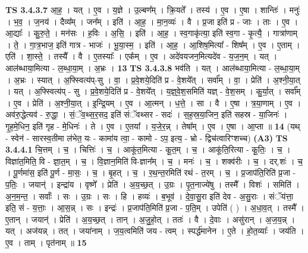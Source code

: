 \documentclass[17pt]{extarticle}
\begin{document}
                                \textbf{ TS 3.4.3.7} \newline
                  आ॒ह॒ । यत् । ए॒व । य॒ज्ञे । उ॒ल्बण᳚म् । क्रि॒यते᳚ । तस्य॑ । ए॒व । ए॒षा । शान्तिः॑ । मनुः॑ । भ॒व॒ । ज॒नय॑ । दैव्य᳚म् । जन᳚म् । इति॑ । आ॒ह॒ । मा॒न॒व्यः॑ । वै । प्र॒जा इति॑ प्र - जाः । ताः । ए॒व । आ॒द्याः᳚ । कु॒रु॒ते॒ । मन॑सः । ह॒विः । अ॒सि॒ । इति॑ । आ॒ह॒ । स्व॒गाकृ॑त्या॒ इति॑ स्व॒गा - कृ॒त्यै॒ । गात्रा॑णाम् । ते॒ । गा॒त्र॒भाज॒ इति॑ गात्र - भाजः॑ । भू॒या॒स्म॒ । इति॑ । आ॒ह॒ । आ॒शिष॒मित्या᳚ - शिष᳚म् । ए॒व । ए॒ताम् । एति॑ । शा॒स्ते॒ । तस्यै᳚ । वै । ए॒तस्याः᳚ । एक᳚म् । ए॒व । अदे॑वयजन॒मित्यदे॑व - य॒ज॒न॒म् । यत् । आल॑ब्धाया॒मित्या - ल॒ब्धा॒या॒म् । अ॒भ्रः । \textbf{  13} \newline
                  \newline
                                \textbf{ TS 3.4.3.8} \newline
                  भव॑ति । यत् । आल॑ब्धाया॒मित्या - ल॒ब्धा॒या॒म् । अ॒भ्रः । स्यात् । अ॒फ्स्वित्य॑प्-सु । वा॒ । प्र॒वे॒शये॒दिति॑ प्र - वे॒शये᳚त् । सर्वा᳚म् । वा॒ । प्रेति॑ । अ॒श्नी॒या॒त् । यत् । अ॒फ्स्वित्य॑प् - सु । प्र॒वे॒शये॒दिति॑ प्र - वे॒शये᳚त् । य॒ज्ञ्॒वे॒श॒समिति॑ यज्ञ् - वे॒श॒सम् । कु॒र्या॒त् । सर्वा᳚म् । ए॒व । प्रेति॑ । अ॒श्नी॒या॒त् । इ॒न्द्रि॒यम् । ए॒व । आ॒त्मन् । ध॒त्ते॒ । सा । वै । ए॒षा । त्र॒या॒णाम् । ए॒व । अव॑रु॒द्धेत्यव॑ - रु॒द्धा॒ । सं॒ॅव॒थ्स॒र॒सद॒ इति॑ संॅवथ्सर - सदः॑ । स॒ह॒स्र॒या॒जिन॒ इति॑ सहस्र - या॒जिनः॑ । गृ॒ह॒मे॒धिन॒ इति॑ गृह - मे॒धिनः॑ । ते । ए॒व । ए॒तया᳚ । य॒जे॒र॒न्न् । तेषा᳚म् । ए॒व । ए॒षा । आ॒प्ता ॥ \textbf{  14} \newline
                  \newline
                      (यथ् - स्वेन॑ - सारस्व॒तीमा ल॑भेत॒ यः - कामा॑य त्वा॒ - कामो - ऽप॒ इत्य॒ - भ्रो - द्विच॑त्वारिꣳशच्च)  \textbf{(A3)} \newline \newline
                                \textbf{ TS 3.4.4.1} \newline
                  चि॒त्तम् । च॒ । चित्तिः॑ । च॒ । आकू॑त॒मित्या - कू॒त॒म् । च॒ । आकू॑ति॒रित्या - कू॒तिः॒ । च॒ । विज्ञा॑त॒मिति॒ वि - ज्ञा॒त॒म् । च॒ । वि॒ज्ञान॒मिति॑ वि-ज्ञान᳚म् । च॒ । मनः॑ । च॒ । शक्व॑रीः । च॒ । दर्.शः॑ । च॒ । पू॒र्णमा॑स॒ इति॑ पू॒र्ण - मा॒सः॒ । च॒ । बृ॒हत् । च॒ । र॒थ॒न्त॒रमिति॑ रथं - त॒रम् । च॒ । प्र॒जाप॑ति॒रिति॑ प्र॒जा - प॒तिः॒ । जयान्॑ । इन्द्रा॑य । वृष्णे᳚ । प्रेति॑ । अ॒य॒च्छ॒त् । उ॒ग्रः । पृ॒त॒नाज्ये॑षु । तस्मै᳚ । विशः॑ । समिति॑ । अ॒न॒म॒न्त॒ । सर्वाः᳚ । सः । उ॒ग्रः । सः । हि । हव्यः॑ । ब॒भूव॑ । दे॒वा॒सु॒रा इति॑ देव - अ॒सु॒राः । संॅय॑त्ता॒ इति॒ सं - य॒त्ताः॒ । आ॒स॒न्न् । सः । इन्द्रः॑ । प्र॒जाप॑ति॒मिति॑ प्र॒जा - प॒ति॒म् । उपेति॑ ( ) । अ॒धा॒व॒त् । तस्मै᳚ । ए॒तान् । जयान्॑ । प्रेति॑ । अ॒य॒च्छ॒त् । तान् । अ॒जु॒हो॒त् । ततः॑ । वै । दे॒वाः । असु॑रान् । अ॒ज॒य॒न्न् । यत् । अज॑यन्न् । तत् । जया॑नाम् । ज॒य॒त्वमिति॑ जय - त्वम् । स्पर्द्ध॑मानेन । ए॒ते । हो॒त॒व्याः᳚ । जय॑ति । ए॒व । ताम् । पृत॑नाम् ॥ \textbf{  15} \newline
\end{document}
